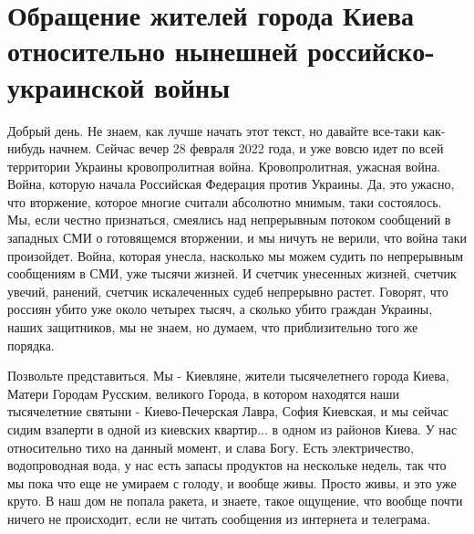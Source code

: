  
 
 
 
 

\section{Обращение жителей города Киева относительно нынешней российско-украинской войны}

Добрый день. Не знаем, как лучше начать этот текст, но давайте все-таки
как-нибудь начнем. Сейчас вечер 28 февраля 2022 года, и уже вовсю идет по всей
территории Украины кровопролитная война. Кровопролитная, ужасная война.  Война,
которую начала Российская Федерация против Украины. Да, это ужасно, что
вторжение, которое многие считали абсолютно мнимым, таки состоялось. Мы, если
честно признаться, смеялись над непрерывным потоком сообщений в западных СМИ о
готовящемся вторжении, и мы ничуть не верили, что война таки произойдет. Война,
которая унесла, насколько мы можем судить по непрерывным сообщениям в СМИ, уже
тысячи жизней. И счетчик унесенных жизней, счетчик увечий, ранений, счетчик
искалеченных судеб непрерывно растет. Говорят, что россиян убито уже около
четырех тысяч, а сколько убито граждан Украины, наших защитников, мы не знаем,
но думаем, что приблизительно того же порядка.

Позвольте представиться. Мы - Киевляне, жители тысячелетнего города Киева,
Матери Городам Русским, великого Города, в котором находятся наши тысячелетние
святыни - Киево-Печерская Лавра, София Киевская, и мы сейчас сидим взаперти в
одной из киевских квартир... в одном из районов Киева. У нас относительно тихо
на данный момент, и слава Богу. Есть электричество, водопроводная вода, у нас
есть запасы продуктов на нескольке недель, так что мы пока что еще не умираем с
голоду, и вообще живы. Просто живы, и это уже круто. В наш дом не попала
ракета, и знаете, такое ощущение, что вообще почти ничего не происходит, если
не читать сообщения из интернета и телеграма. 

